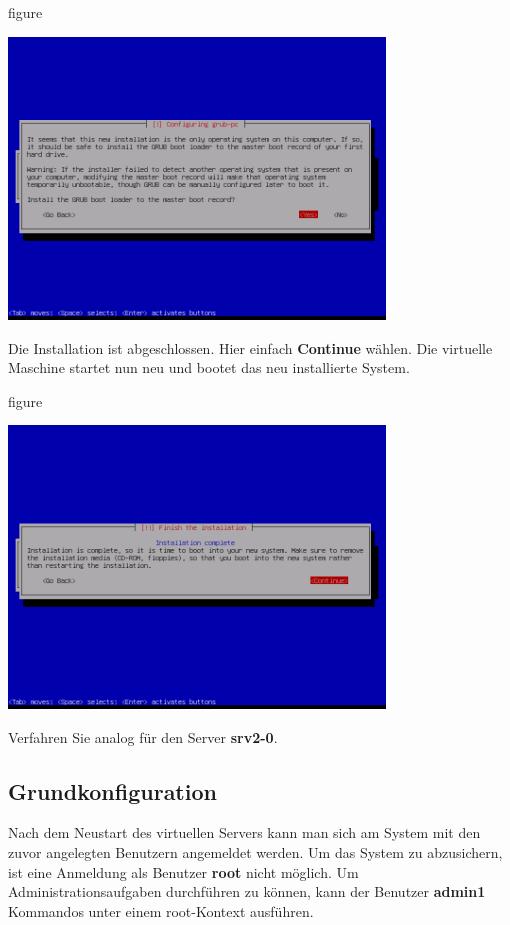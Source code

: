 \begin{nofloat}{figure}
\begin{center}
\includegraphics[width=0.75\textwidth]{screenshots/34_ubuntu_install.png}
\end{center}
\end{nofloat}
\newpage
Die Installation ist abgeschlossen. Hier einfach \textbf{Continue} wählen. Die
virtuelle Maschine startet nun neu und bootet das neu installierte System.

\begin{nofloat}{figure}
\begin{center}
\includegraphics[width=0.75\textwidth]{screenshots/35_ubuntu_install.png}
\end{center}
\end{nofloat}

Verfahren Sie analog für den Server \textbf{srv2-0}.

\subsection{Grundkonfiguration}
Nach dem Neustart des virtuellen Servers kann man sich am System mit den zuvor
angelegten Benutzern angemeldet werden. Um das System zu abzusichern, ist eine
Anmeldung als Benutzer \textbf{root} nicht möglich. Um Administrationsaufgaben
durchführen zu können, kann der Benutzer \textbf{admin1} Kommandos unter einem
root-Kontext ausführen.

